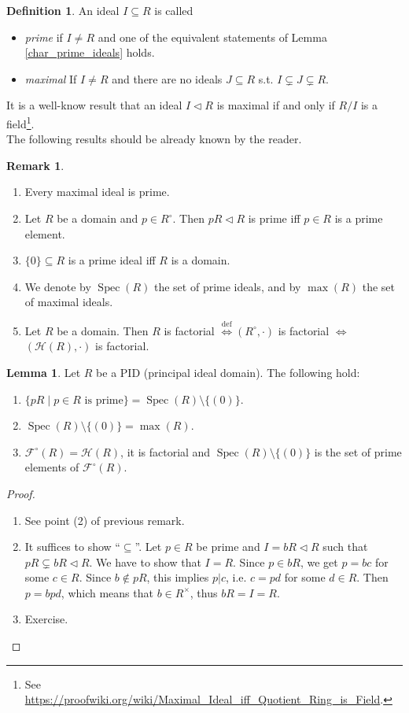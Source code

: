 \documentclass[12pt,a4paper]{report}
\theoremstyle{definition}
\newtheorem{lemma}[theorem]{Lemma}
\newtheorem{defn}[theorem]{Definition}
\newtheorem{Remark}[theorem]{Remark}
\theoremstyle{num.custom-title}
\DeclareMathOperator{\sm}{\setminus}
\DeclareMathOperator{\sse}{\subseteq}
\DeclareMathOperator{\Spec}{Spec}
\newcommand{\F}{\mathcal{F}}
\renewcommand{\H}{\mathcal{H}}
\renewcommand{\iff}{\Leftrightarrow}
\begin{document}
\begin{defn}
An ideal $I \sse R$ is called
\begin{itemize}
\item \emph{prime} if $I \neq R$ and one of the equivalent statements of Lemma \ref{char_prime_ideals} holds.
\item \emph{maximal} If $I \neq R$ and there are no ideals $J \sse R$ s.t. $I \subsetneq J \subsetneq R$.
\end{itemize}
\end{defn}

It is a well-know result that an ideal $I \lhd R$ is maximal if and only if $R/I$ is a field\footnote{See \url{https://proofwiki.org/wiki/Maximal_Ideal_iff_Quotient_Ring_is_Field}.}.\\
The following results should be already known by the reader.

\begin{Remark}\ 
\begin{enumerate}
\item Every maximal ideal is prime.
\item Let $R$ be a domain and $p \in R^\circ$. Then $pR \lhd R$ is prime iff $p \in R$ is a prime element.
\item $\{0\} \sse R$ is a prime ideal iff $R$ is a domain.
\item We denote by $\Spec(R)$ the set of prime ideals, and by $\max(R)$ the set of maximal ideals.
\item Let $R$ be a domain. Then $R$ is factorial $\stackrel{\text{def}}{\iff} (R^\circ,\cdot)$ is factorial $\iff$ $(\H(R),\cdot)$ is factorial.
\end{enumerate}
\end{Remark}

\begin{lemma}
Let $R$ be a PID (principal ideal domain). The following hold:
\begin{enumerate}
\item $\{pR \mid p \in R \text{ is prime}\} = \Spec(R) \sm \{(0)\}$.
\item $\Spec(R) \sm \{(0)\} = \max(R)$.
\item $\F^\circ(R) = \H(R)$, it is factorial and $\Spec(R) \sm \{(0)\}$ is the set of prime elements of $\F^\circ(R)$.
\end{enumerate}
\begin{proof}\ 
\begin{enumerate}
\item See point (2) of previous remark.
\item It suffices to show ``$\sse$''. Let $p \in R$ be prime and $I=bR \lhd R$ such that $pR \subsetneq bR \lhd R$. We have to show that $I=R$. Since $p \in bR$, we get $p=bc$ for some $c \in R$. Since $b \not\in pR$, this implies $p|c$, i.e. $c=pd$ for some $d \in R$. Then $p=bpd$, which means that $b \in R^\times$, thus $bR=I=R$.
\item Exercise.
\end{enumerate}
\end{proof}
\end{lemma}
\end{document}
